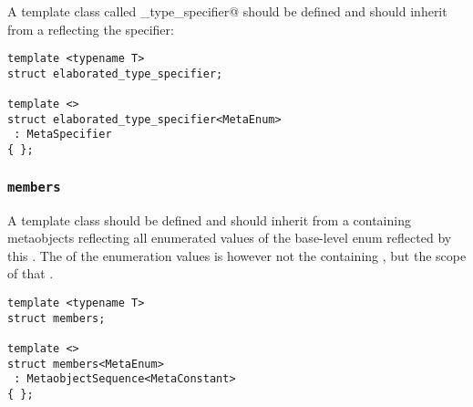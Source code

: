 A template class called \verb@elaborated_type_specifier@ should be defined and should inherit from
a  reflecting the \verb@enum@ specifier:

\begin{verbatim}
template <typename T>
struct elaborated_type_specifier;

template <>
struct elaborated_type_specifier<MetaEnum>
 : MetaSpecifier
{ };
\end{verbatim}

\subsubsection{\texttt{members}}

A template class \verb@members@ should be defined and should inherit from a
 containing   metaobjects
reflecting all enumerated values of the base-level enum reflected by
this . The \verb@scope@ of the enumeration values is however not the
containing \verb@enum@, but the scope of that \verb@enum@.

\begin{verbatim}
template <typename T>
struct members;

template <>
struct members<MetaEnum>
 : MetaobjectSequence<MetaConstant>
{ };
\end{verbatim}


